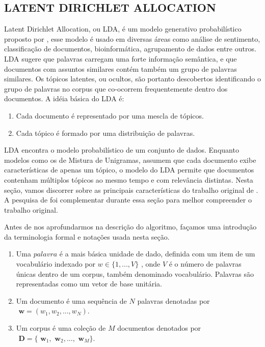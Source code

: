 \documentclass[12pt,a4paper]{article}
\begin{document}
\subsection{LATENT DIRICHLET ALLOCATION}
Latent Dirichlet Allocation, ou LDA, é um modelo generativo probabilístico proposto por , esse modelo é usado em diversas áreas como análise de sentimento,
 classificação de documentos, bioinformática, agrupamento de dados entre outros. LDA sugere que palavras carregam uma forte informação semântica,
 e que documentos com assuntos similares contém também um grupo de palavras similares. Os tópicos latentes, ou ocultos,
 são portanto descobertos identificando o grupo de palavras no corpus que co-ocorrem frequentemente dentro dos documentos. A idéia básica do LDA é:

\begin{enumerate}
  \item Cada documento é representado por uma mescla de tópicos.
  \item Cada tópico é formado por uma distribuição de palavras.
\end{enumerate}

LDA encontra o modelo probabilístico de um conjunto de dados. Enquanto modelos como os de Mistura de Unigramas, assumem que cada documento exibe características de apenas um tópico,
 o modelo do LDA  permite que documentos contenham múltiplos tópicos ao mesmo tempo e com relevância distintas. Nesta seção, vamos discorrer sobre as principais características do trabalho original de .
 A pesquisa de  foi complementar durante essa seção para melhor compreender o trabalho original.

Antes de nos aprofundarmos na descrição do algoritmo, façamos uma introdução da terminologia formal e notações usada nesta seção.

\begin{enumerate}
  \item Uma $palavra$ é a mais básica unidade de dado, definida com um item de um vocabulário indexado por \(w \in \{1,. . . , V\}\)  , onde $V$ é o número de palavras únicas dentro de um corpus, também denominado vocabulário. Palavras são representadas como um vetor de base unitária.
  \item Um documento é uma sequência de $N$ palavras denotadas por \(\textbf{ w} = (w_1, w_2,. . . ,  w_N)\).
  \item Um corpus é uma coleção de $M$ documentos denotados por \(\textbf{ D} = \{\textbf{ w}_1, \textbf{ w}_2, . . ., \textbf{ w}_M\}\).
\end{enumerate}
\end{document}
